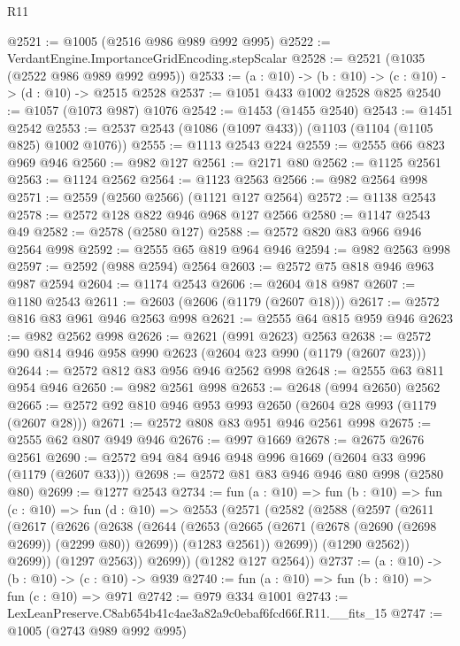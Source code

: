 \begin{lexlean}{R11}
\begin{coremodule}
@2521 := @1005 (@2516 @986 @989 @992 @995)
@2522 := VerdantEngine.ImportanceGridEncoding.stepScalar
@2528 := @2521 (@1035 (@2522 @986 @989 @992 @995))
@2533 := (a : @10) -> (b : @10) -> (c : @10) -> (d : @10) -> @2515 @2528
@2537 := @1051 @433 @1002 @2528 @825
@2540 := @1057 (@1073 @987) @1076
@2542 := @1453 (@1455 @2540)
@2543 := @1451 @2542
@2553 := @2537 @2543 (@1086 (@1097 @433)) (@1103 (@1104 (@1105 @825) @1002 @1076))
@2555 := @1113 @2543 @224
@2559 := @2555 @66 @823 @969 @946
@2560 := @982 @127
@2561 := @2171 @80
@2562 := @1125 @2561
@2563 := @1124 @2562
@2564 := @1123 @2563
@2566 := @982 @2564 @998
@2571 := @2559 (@2560 @2566) (@1121 @127 @2564)
@2572 := @1138 @2543
@2578 := @2572 @128 @822 @946 @968 @127 @2566
@2580 := @1147 @2543 @49
@2582 := @2578 (@2580 @127)
@2588 := @2572 @820 @83 @966 @946 @2564 @998
@2592 := @2555 @65 @819 @964 @946
@2594 := @982 @2563 @998
@2597 := @2592 (@988 @2594) @2564
@2603 := @2572 @75 @818 @946 @963 @987 @2594
@2604 := @1174 @2543
@2606 := @2604 @18 @987
@2607 := @1180 @2543
@2611 := @2603 (@2606 (@1179 (@2607 @18)))
@2617 := @2572 @816 @83 @961 @946 @2563 @998
@2621 := @2555 @64 @815 @959 @946
@2623 := @982 @2562 @998
@2626 := @2621 (@991 @2623) @2563
@2638 := @2572 @90 @814 @946 @958 @990 @2623 (@2604 @23 @990 (@1179 (@2607 @23)))
@2644 := @2572 @812 @83 @956 @946 @2562 @998
@2648 := @2555 @63 @811 @954 @946
@2650 := @982 @2561 @998
@2653 := @2648 (@994 @2650) @2562
@2665 := @2572 @92 @810 @946 @953 @993 @2650 (@2604 @28 @993 (@1179 (@2607 @28)))
@2671 := @2572 @808 @83 @951 @946 @2561 @998
@2675 := @2555 @62 @807 @949 @946
@2676 := @997 @1669
@2678 := @2675 @2676 @2561
@2690 := @2572 @94 @84 @946 @948 @996 @1669 (@2604 @33 @996 (@1179 (@2607 @33)))
@2698 := @2572 @81 @83 @946 @946 @80 @998 (@2580 @80)
@2699 := @1277 @2543
@2734 := fun (a : @10) =>
  fun (b : @10) =>
  fun (c : @10) =>
  fun (d : @10) =>
  @2553
    (@2571
      (@2582
        (@2588
          (@2597
            (@2611
              (@2617
                (@2626
                  (@2638
                    (@2644
                      (@2653
                        (@2665 (@2671 (@2678 (@2690 (@2698 @2699)) (@2299 @80)) @2699))
                        (@1283 @2561))
                      @2699))
                  (@1290 @2562))
                @2699))
            (@1297 @2563))
          @2699))
      (@1282 @127 @2564))
@2737 := (a : @10) -> (b : @10) -> (c : @10) -> @939
@2740 := fun (a : @10) => fun (b : @10) => fun (c : @10) => @971
@2742 := @979 @334 @1001
@2743 := LexLeanPreserve.C8ab654b41c4ae3a82a9c0ebaf6fcd66f.R11.__fits_15
@2747 := @1005 (@2743 @989 @992 @995)

\end{coremodule}
\end{lexlean}
